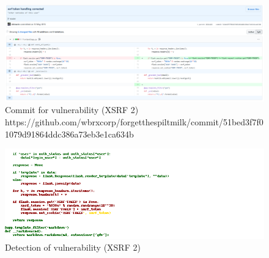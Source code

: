 \documentclass[
a4paper,
pagesize,
pdftex,
12pt,
twoside, %
BCOR=5mm, %
ngerman,
fleqn,
final,
]{scrartcl}
\begin{document}
	
	\begin{figure}[H]
		\centering
		\includegraphics[width=\linewidth]{Images/xsrfB}
		\caption{Commit for vulnerability (XSRF 2) \newline \scriptsize{https://github.com/wbrxcorp/forgetthespiltmilk/commit/51bed3f7f01079d91864ddc386a73eb3e1ca634b}}
		\label{fig:xsrfB}
	\end{figure}
	\begin{figure}[H]
		\centering
		\includegraphics[width=\linewidth]{Images/xsrfBr}
		\caption{Detection of vulnerability (XSRF 2)}
		\label{fig:xsrfBr}
	\end{figure}
	
\end{document}
